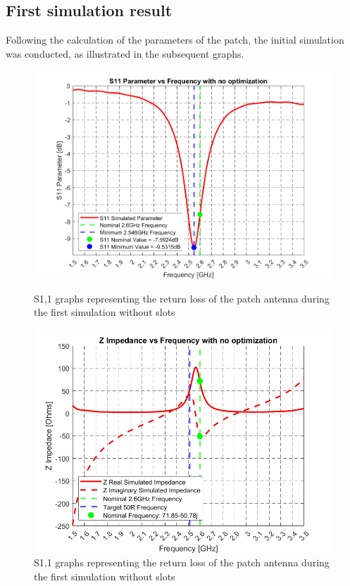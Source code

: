 \documentclass[]{article}
\begin{document}
\subsection{First simulation result}
Following the calculation of the parameters of the patch, the initial simulation was conducted, as illustrated in the subsequent graphs.\\
\begin{figure}[h]
	\centering
	\begin{minipage}{0.45\linewidth}
		\centering
		\includegraphics[width=\linewidth]{img/img7}
		\caption{S1,1 graphs representing the return loss of the patch antenna during the first simulation without slots}
		\label{GSNOslot}
	\end{minipage}\hfill
	\begin{minipage}{0.45\linewidth}
		\centering
		\includegraphics[width=\linewidth]{img/img8}
		\caption{S1,1 graphs representing the return loss of the patch antenna during the first simulation without slots}
		\label{GZNOslot}
	\end{minipage}
\end{figure}
\end{document}
